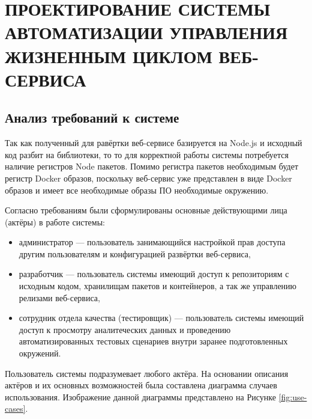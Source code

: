 \chapter{ПРОЕКТИРОВАНИЕ СИСТЕМЫ АВТОМАТИЗАЦИИ УПРАВЛЕНИЯ ЖИЗНЕННЫМ ЦИКЛОМ ВЕБ-СЕРВИСА}
\label{cha:design}

\section{Анализ требований к системе}

Так как полученный для равёртки веб-сервисе базируется на Node.js и исходный код разбит на библиотеки, то то для корректной
работы системы потребуется наличие регистров Node пакетов.
Помимо регистра пакетов необходимым будет регистр Docker образов, поскольку веб-сервис уже представлен в виде Docker образов
и имеет все необходимые образы ПО необходимые окружению.

Согласно требованиям были сформулированы основные действующими лица (актёры) в работе системы:
\begin{itemize}
    \item администратор --- пользователь занимающийся настройкой прав доступа другим пользователям
        и конфигурацией развёртки веб-сервиса,
    \item разработчик --- пользователь системы имеющий доступ к репозиториям с исходным кодом,
        хранилищам пакетов и контейнеров, а так же управлению релизами веб-сервиса,
    \item сотрудник отдела качества (тестировщик) --- пользователь системы имеющий доступ к просмотру аналитеческих данных и
        проведению автоматизированных тестовых сценариев внутри заранее подготовленных окружений.
\end{itemize}

Пользователь системы подразумевает любого актёра.
На основании описания актёров и их основных возможностей была составлена диаграмма случаев использования.
Изображение данной диаграммы представлено на Рисунке \ref{fig:use-cases}.

